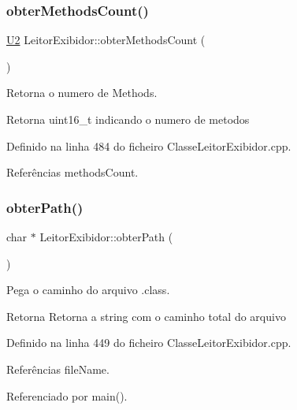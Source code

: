 \subsubsection{\texorpdfstring{obter\+Methods\+Count()}{obterMethodsCount()}}
{\footnotesize\ttfamily \hyperlink{BasicTypes_8h_a90240657108b1b457eef9d3f76e0202e}{U2} Leitor\+Exibidor\+::obter\+Methods\+Count (\begin{DoxyParamCaption}{ }\end{DoxyParamCaption})}



Retorna o numero de Methods. 

\begin{DoxyReturn}{Retorna}
uint16\+\_\+t indicando o numero de metodos 
\end{DoxyReturn}


Definido na linha 484 do ficheiro Classe\+Leitor\+Exibidor.\+cpp.



Referências methods\+Count.

\mbox{\label{classLeitorExibidor_a74785a29369d04d5a7d14ed63a0b2102}} 
\subsubsection{\texorpdfstring{obter\+Path()}{obterPath()}}
{\footnotesize\ttfamily char $\ast$ Leitor\+Exibidor\+::obter\+Path (\begin{DoxyParamCaption}{ }\end{DoxyParamCaption})}



Pega o caminho do arquivo .class. 

\begin{DoxyReturn}{Retorna}
Retorna a string com o caminho total do arquivo 
\end{DoxyReturn}


Definido na linha 449 do ficheiro Classe\+Leitor\+Exibidor.\+cpp.



Referências file\+Name.



Referenciado por main().

\mbox{\label{classLeitorExibidor_a6a9e55a1b824fed37f0841cb253789b2}} 
